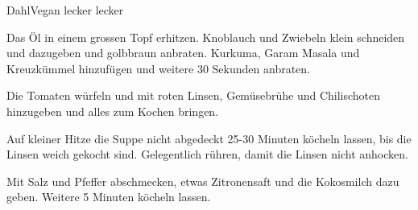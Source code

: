 
\begin{recipe}[]{Dahl}{Vegan lecker lecker}{}



\step
Das \"Ol in einem grossen Topf erhitzen. Knoblauch und Zwiebeln klein schneiden und dazugeben und golbbraun anbraten. Kurkuma, Garam Masala und Kreuzk\"ummel hinzuf\"ugen und weitere 30 Sekunden anbraten.

\step
Die Tomaten w\"urfeln und mit roten Linsen, Gem\"usebr\"uhe und Chilischoten hinzugeben und alles zum Kochen bringen.


\step
Auf kleiner Hitze die Suppe nicht abgedeckt 25-30 Minuten k\"ocheln lassen, bis die Linsen weich gekocht sind.
Gelegentlich r\"uhren, damit die Linsen nicht anhocken.

\step
Mit Salz und Pfeffer abschmecken, etwas Zitronensaft und die Kokosmilch dazu geben. Weitere 5 Minuten k\"ocheln lassen.

\end{recipe}

